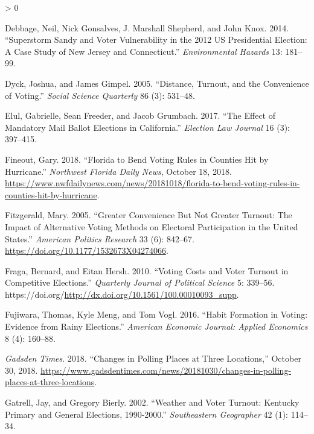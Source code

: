 \documentclass[
  12pt,
]{article}
\newlength{\cslhangindent}
\newenvironment{CSLReferences}[2] %
 {%
  \setlength{\parindent}{0pt}
  \ifodd #1 \everypar{\setlength{\hangindent}{\cslhangindent}}\ignorespaces\fi
  \ifnum #2 > 0
  \setlength{\parskip}{#2\baselineskip}
  \fi
 }%
 {}
\begin{document}
\begin{CSLReferences}{1}{0}
\leavevmode\hypertarget{ref-Debbage2014}{}%
Debbage, Neil, Nick Gonsalves, J. Marshall Shepherd, and John Knox. 2014. {``Superstorm {Sandy} and {Voter Vulnerability} in the 2012 {US Presidential Election}: {A Case Study} of {New Jersey} and {Connecticut}.''} \emph{Environmental Hazards} 13: 181--99.

\leavevmode\hypertarget{ref-Dyck2005}{}%
Dyck, Joshua, and James Gimpel. 2005. {``Distance, {Turnout}, and the {Convenience} of {Voting}.''} \emph{Social Science Quarterly} 86 (3): 531--48.

\leavevmode\hypertarget{ref-Elul2017}{}%
Elul, Gabrielle, Sean Freeder, and Jacob Grumbach. 2017. {``The {Effect} of {Mandatory Mail Ballot Elections} in {California}.''} \emph{Election Law Journal} 16 (3): 397--415.

\leavevmode\hypertarget{ref-Fineout2018}{}%
Fineout, Gary. 2018. {``Florida to Bend Voting Rules in Counties Hit by Hurricane.''} \emph{Northwest Florida Daily News}, October 18, 2018. \url{https://www.nwfdailynews.com/news/20181018/florida-to-bend-voting-rules-in-counties-hit-by-hurricane}.

\leavevmode\hypertarget{ref-Fitzgerald2005}{}%
Fitzgerald, Mary. 2005. {``Greater {Convenience But Not Greater Turnout}: {The Impact} of {Alternative Voting Methods} on {Electoral Participation} in the {United States}.''} \emph{American Politics Research} 33 (6): 842--67. \url{https://doi.org/10.1177/1532673X04274066}.

\leavevmode\hypertarget{ref-Fraga2010}{}%
Fraga, Bernard, and Eitan Hersh. 2010. {``Voting {Costs} and {Voter Turnout} in {Competitive Elections}.''} \emph{Quarterly Journal of Political Science} 5: 339--56. https://doi.org/\url{http://dx.doi.org/10.1561/100.00010093_supp}.

\leavevmode\hypertarget{ref-Fujiwara2016}{}%
Fujiwara, Thomas, Kyle Meng, and Tom Vogl. 2016. {``Habit {Formation} in {Voting}: {Evidence} from {Rainy Elections}.''} \emph{American Economic Journal: Applied Economics} 8 (4): 160--88.

\leavevmode\hypertarget{ref-gadsdentimes2018}{}%
\emph{Gadsden Times}. 2018. {``Changes in Polling Places at Three Locations,''} October 30, 2018. \url{https://www.gadsdentimes.com/news/20181030/changes-in-polling-places-at-three-locations}.

\leavevmode\hypertarget{ref-Gatrell2002}{}%
Gatrell, Jay, and Gregory Bierly. 2002. {``Weather and {Voter Turnout}: {Kentucky Primary} and {General Elections}, 1990-2000.''} \emph{Southeastern Geographer} 42 (1): 114--34.


\end{CSLReferences}
\end{document}
